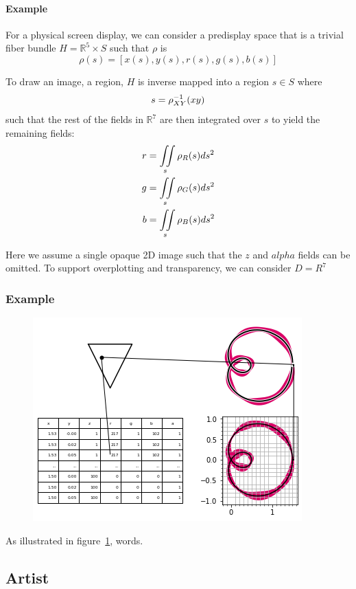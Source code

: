 \documentclass[../main.tex]{subfiles}
\begin{document}
\paragraph{Example}
For a physical screen display, we can consider a predisplay space that is a trivial fiber bundle $H=\mathbb{R}^{5}\times S$ such that $\rho$ is
\begin{equation}
    \rho(s)  = [x(s), y(s), r(s), g(s), b(s)]
    \label{eq:rho}
\end{equation}

To draw an image, a region, $H$ is inverse mapped into a region $s \in S$ where
\begin{equation}
s = \rho^{-1}_{\tiny{XY}}(xy)
\end{equation}
such that the rest of the fields in $\mathbb{R}^{7}$ are then integrated over $s$ to yield the remaining fields:
\begin{align}
    r &= \iint\limits_s \rho_{\tiny{R}}(s)ds^{2}\\
    g &= \iint\limits_s \rho_{\tiny{G}}(s)ds^{2}\\
    b &= \iint\limits_s \rho_{\tiny{B}}(s)ds^{2}
\end{align}

Here we assume a single opaque 2D image such that the $z$ and $alpha$ fields can be omitted. To support overplotting and transparency, we can consider $D=R^{7}$

\subsubsection{{Example}}
\begin{figure}[H]
    \includegraphics[width=.4\linewidth]{figures/sections/math/render.png}
    \caption{}
    \label{fig:render}
\end{figure}

As illustrated in figure~\ref{fig:render}, words.

\subsection{Artist}
\end{document}
